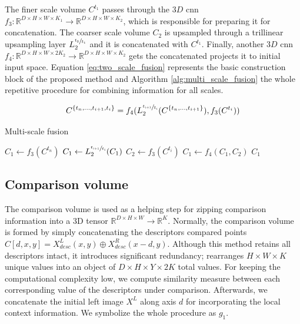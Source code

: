 \documentclass[10pt]{article}
\begin{document}
The finer scale volume $C^{t_1}$ passes through the $3D$ cnn $f_3: \mathbb{R}^{D \times H \times W \times K_1} \rightarrow  \mathbb{R}^{D \times H \times W \times K_2}$, which is responsible for preparing it for concatenation. The coarser scale volume $C_2$ is upsampled through a trillinear upsampling layer $L_2^{\sfrac{t_2}{t_1}}$ and it is concatenated with $C^{t_1}$. Finally, another $3D$ cnn $f_4: \mathbb{R}^{D \times H \times W \times 2K_2} \rightarrow  \mathbb{R}^{D \times H \times W \times K_2}$ gets the concatenated  projects it to initial input space. Equation \ref{eq:two_scale_fusion} represents the basic construction block of the proposed method and Algorithm \ref{alg:multi_scale_fusion} the whole repetitive procedure for combining information for all scales.

\begin{equation} \label{eq:two_scale_fusion}
C^{ \{ t_n, ..., t_{i+1}, t_{i} \} } = f_4(L_2^{\sfrac{t_{i+1}}{t_i} }(C^{ \{ t_n, ..., t_{i+1} \} }), f_3(C^{t_i}) )
\end{equation}


\begin{algorithm}
\caption{Multi-scale fusion}\label{alg:multi_scale_fusion}
\begin{algorithmic}[1]
\State $C_1 \gets f_3(C^{t_n})$ 
\State $C_1 \gets L_2^{\sfrac{ t_{i+1} }{ t_i } }(C_1)$ 
\State $C_2 \gets f_3(C^{t_i})$ 
\State $C_1 \gets f_4(C_1, C_2)$ 
\EndFor
\State \Return $C_1$
\EndProcedure
\end{algorithmic}
\end{algorithm}


\subsection{Comparison volume} \label{sec:comparison_volume}

The comparison volume is used as a helping step for zipping comparison information into a 3D tensor $\mathbb{R}^{D \times H \times W} \rightarrow \mathbb{R}^K$. Normally, the comparison volume is formed by simply concatenating the descriptors compared points $C[d, x, y]  = X^L_{desc}(x,y) \oplus  X^R_{desc}(x-d,y)$. Although this method retains all descriptors intact, it introduces significant redundancy; rearranges $H \times W \times K$ unique values into an object of $D \times H \times Y \times 2K$ total values. For keeping the computational complexity low, we compute similarity measure between each corresponding value of the descriptors under comparison. Afterwards, we concatenate the initial left image $X^L$ along axis $d$ for incorporating the local context information. We symbolize the whole procedure as $g_1$.
\end{document}
